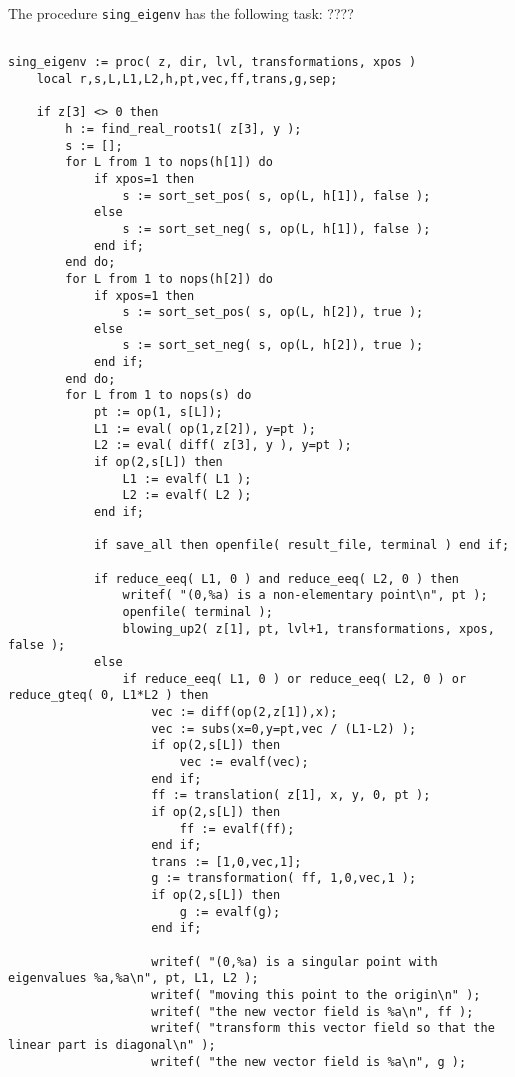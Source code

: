 \documentclass[a4paper,10pt]{article}
\begin{document}
\begin{lstlisting}[name=blowup]
\end{lstlisting}

The procedure \verb+sing_eigenv+ has the following task: ????

\begin{lstlisting}[name=blowup]

sing_eigenv := proc( z, dir, lvl, transformations, xpos )
    local r,s,L,L1,L2,h,pt,vec,ff,trans,g,sep;

    if z[3] <> 0 then
        h := find_real_roots1( z[3], y );
        s := [];
        for L from 1 to nops(h[1]) do
            if xpos=1 then
                s := sort_set_pos( s, op(L, h[1]), false );
            else
                s := sort_set_neg( s, op(L, h[1]), false );
            end if;
        end do;
        for L from 1 to nops(h[2]) do
            if xpos=1 then
                s := sort_set_pos( s, op(L, h[2]), true );
            else
                s := sort_set_neg( s, op(L, h[2]), true );
            end if;
        end do;
        for L from 1 to nops(s) do
            pt := op(1, s[L]);
            L1 := eval( op(1,z[2]), y=pt );
            L2 := eval( diff( z[3], y ), y=pt );
            if op(2,s[L]) then
                L1 := evalf( L1 );
                L2 := evalf( L2 );
            end if;

            if save_all then openfile( result_file, terminal ) end if;

            if reduce_eeq( L1, 0 ) and reduce_eeq( L2, 0 ) then
                writef( "(0,%a) is a non-elementary point\n", pt );
                openfile( terminal );
                blowing_up2( z[1], pt, lvl+1, transformations, xpos, false );
            else
                if reduce_eeq( L1, 0 ) or reduce_eeq( L2, 0 ) or reduce_gteq( 0, L1*L2 ) then
                    vec := diff(op(2,z[1]),x);
                    vec := subs(x=0,y=pt,vec / (L1-L2) );
                    if op(2,s[L]) then
                        vec := evalf(vec);
                    end if;
                    ff := translation( z[1], x, y, 0, pt );
                    if op(2,s[L]) then
                        ff := evalf(ff);
                    end if;
                    trans := [1,0,vec,1];
                    g := transformation( ff, 1,0,vec,1 );
                    if op(2,s[L]) then
                        g := evalf(g);
                    end if;

                    writef( "(0,%a) is a singular point with eigenvalues %a,%a\n", pt, L1, L2 );
                    writef( "moving this point to the origin\n" );
                    writef( "the new vector field is %a\n", ff );
                    writef( "transform this vector field so that the linear part is diagonal\n" );
                    writef( "the new vector field is %a\n", g );


\end{lstlisting}
\end{document}
